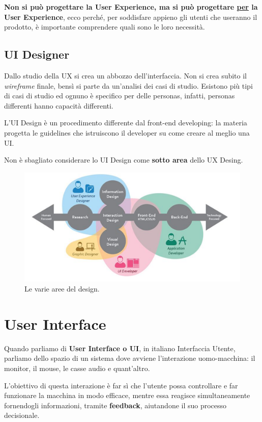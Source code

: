 \documentclass[a4paper,11pt,oneside]{book}
\begin{document}
\textbf{Non si può progettare la User Experience, ma si può progettare \underline{per} la User Experience}, ecco perché, per soddisfare appieno gli utenti che useranno il prodotto, è importante comprendere quali sono le loro necessità.

\section{UI Designer}
Dallo studio della UX si crea un abbozzo dell'interfaccia. Non si crea subito il \textit{wireframe} finale, bensì si parte da un'analisi dei casi di studio. Esistono più tipi di casi di studio ed ognuno è specifico per delle personas, infatti, personas differenti hanno capacità differenti.

L'UI Design è un procedimento differente dal front-end developing: la materia progetta le guidelines che istruiscono il developer su come creare al meglio una UI.

Non è sbagliato considerare lo UI Design come \textbf{sotto area} dello UX Desing.

\begin{figure}[!h]
	\centering
	\includegraphics[scale = 0.4]{immagini/UX_and_UI.png}
	\caption{Le varie aree del design.}
\end{figure}


\chapter{User Interface}
Quando parliamo di \textbf{User Interface o UI}, in italiano Interfaccia Utente, parliamo dello spazio di un sistema dove avviene l'interazione uomo-macchina: il monitor, il mouse, le casse audio e quant'altro.

L'obiettivo di questa interazione è far sì che l'utente possa controllare e far funzionare la macchina in modo efficace, mentre essa reagisce simultaneamente fornendogli informazioni, tramite \textbf{feedback}, aiutandone il suo processo decisionale.
\end{document}
